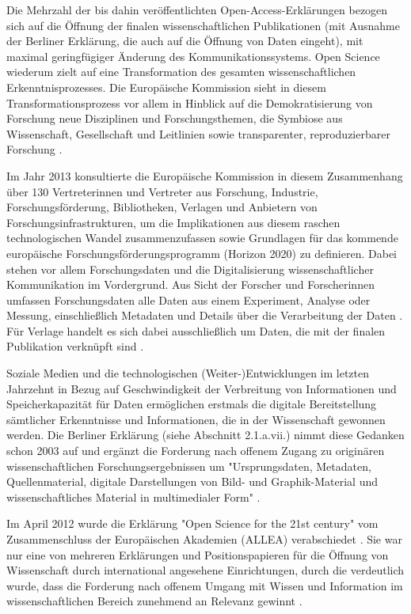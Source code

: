 Die Mehrzahl der bis dahin veröffentlichten Open-Access-Erklärungen bezogen sich auf die Öffnung der finalen wissenschaftlichen Publikationen (mit Ausnahme der Berliner Erklärung, die auch auf die Öffnung von Daten eingeht), mit maximal geringfügiger Änderung des Kommunikationssystems. Open Science wiederum zielt auf eine Transformation des gesamten wissenschaftlichen Erkenntnisprozesses. Die Europäische Kommission sieht in diesem Transformationsprozess vor allem in Hinblick auf die Demokratisierung von Forschung neue Disziplinen und Forschungsthemen, die Symbiose aus Wissenschaft, Gesellschaft und Leitlinien sowie transparenter, reproduzierbarer Forschung \cite{European_Commission_2015a}.

Im Jahr 2013 konsultierte die Europäische Kommission in diesem Zusammenhang über 130 Vertreterinnen und Vertreter aus Forschung, Industrie, Forschungsförderung, Bibliotheken, Verlagen und Anbietern von Forschungsinfrastrukturen, um die Implikationen aus diesem raschen technologischen Wandel zusammenzufassen sowie Grundlagen für das kommende europäische Forschungsförderungsprogramm (Horizon 2020) zu definieren. Dabei stehen vor allem Forschungsdaten und die Digitalisierung wissenschaftlicher Kommunikation im Vordergrund. Aus Sicht der Forscher und Forscherinnen umfassen Forschungsdaten alle Daten aus einem Experiment, Analyse oder Messung, einschließlich Metadaten und Details über die Verarbeitung der Daten \cite{European_Commission_2013}. Für Verlage handelt es sich dabei ausschließlich um Daten, die mit der finalen Publikation verknüpft sind \cite{European_Commission_2013}.

Soziale Medien und die technologischen (Weiter-)Entwicklungen im letzten Jahrzehnt in Bezug auf Geschwindigkeit der Verbreitung von Informationen und Speicherkapazität für Daten ermöglichen erstmals die digitale Bereitstellung sämtlicher Erkenntnisse und Informationen, die in der Wissenschaft gewonnen werden. Die Berliner Erklärung (siehe Abschnitt 2.1.a.vii.) nimmt diese Gedanken schon 2003 auf und ergänzt die Forderung nach offenem Zugang zu originären wissenschaftlichen Forschungsergebnissen um "Ursprungsdaten, Metadaten, Quellenmaterial, digitale Darstellungen von Bild- und Graphik-Material und wissenschaftliches Material in multimedialer Form" \cite{Berliner_Erklaerung_2003}.

Im April 2012 wurde die Erklärung "Open Science for the 21st century" vom Zusammenschluss der Europäischen Akademien (ALLEA) verabschiedet \cite{ALLEA_2012}. Sie war nur eine von mehreren Erklärungen und Positionspapieren für die Öffnung von Wissenschaft durch international angesehene Einrichtungen, durch die verdeutlich wurde, dass die Forderung nach offenem Umgang mit Wissen und Information im wissenschaftlichen Bereich zunehmend an Relevanz gewinnt \cite{Schulze_2013}.

